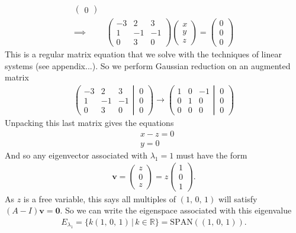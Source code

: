 {\begin{align*}
\begin{pmatrix}
  0 
\end{pmatrix}
\\
\implies &
\begin{pmatrix}
 -3 &  2 &  3 \\
  1 & -1 & -1 \\
  0 &  3 &  0
\end{pmatrix}
\begin{pmatrix} x \\ y \\ z \end{pmatrix}
= 
\begin{pmatrix}
  0 \\
  0 \\
  0 
\end{pmatrix}
\end{align*}
This is a regular matrix equation that we solve with the techniques of linear systems (see appendix...). So we perform Gaussian reduction on an augmented matrix
\begin{align*}
\left(
	\begin{matrix}
 -3 &  2 &  3 \\
  1 & -1 & -1 \\
  0 &  3 &  0
	\end{matrix}
  \left| \, 
	\begin{matrix}
  0 \\
  0 \\
  0 
	\end{matrix}
  \right.
\right)
\to
\left(
	\begin{matrix}
  1 &  0 & -1 \\
  0 &  1 &  0 \\
  0 &  0 &  0
	\end{matrix}
  \left| \, 
	\begin{matrix}
	  0 \\
	  0 \\
	  0 
    \end{matrix}
  \right.
\right)
\end{align*}
Unpacking this last matrix gives the equations
\begin{align*}
& x - z = 0 \\
& y=0
\end{align*}
And so any eigenvector associated with $\lambda_1=1$ must have the form
\begin{align*}
\mathbf{v} = \begin{pmatrix} z \\ 0 \\ z \end{pmatrix}
= z\begin{pmatrix} 1 \\ 0 \\ 1 \end{pmatrix}.
\end{align*}
As $z$ is a free variable, this says all multiples of $(1,\,0,\,1)$ will satisfy $(A-I)\mathbf{v}=\mathbf{0}$. So we can write the eigenspace associated with this eigenvalue
\begin{align*}
E_{\lambda_1} = \{ k(1,\,0,\,1) \, | \, k \in \mathbb{R} \} = \text{SPAN} \left((1,\,0,\,1)\right).
\end{align*}

}
